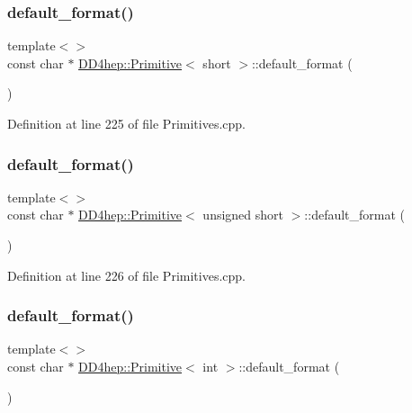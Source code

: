 \subsubsection{\texorpdfstring{default\+\_\+format()}{default\_format()}\hspace{0.1cm}{\footnotesize\ttfamily [5/15]}}
{\footnotesize\ttfamily template$<$$>$ \\
const char $\ast$ \hyperlink{struct_d_d4hep_1_1_primitive}{D\+D4hep\+::\+Primitive}$<$ short $>$\+::default\+\_\+format (\begin{DoxyParamCaption}{ }\end{DoxyParamCaption})}



Definition at line 225 of file Primitives.\+cpp.

\hypertarget{struct_d_d4hep_1_1_primitive_a37a3989db4b5acf5088bc980fef3cb16}{}\label{struct_d_d4hep_1_1_primitive_a37a3989db4b5acf5088bc980fef3cb16} 
\subsubsection{\texorpdfstring{default\+\_\+format()}{default\_format()}\hspace{0.1cm}{\footnotesize\ttfamily [6/15]}}
{\footnotesize\ttfamily template$<$$>$ \\
const char $\ast$ \hyperlink{struct_d_d4hep_1_1_primitive}{D\+D4hep\+::\+Primitive}$<$ unsigned short $>$\+::default\+\_\+format (\begin{DoxyParamCaption}{ }\end{DoxyParamCaption})}



Definition at line 226 of file Primitives.\+cpp.

\hypertarget{struct_d_d4hep_1_1_primitive_a5a493c78bc830f69543606bed337cc3d}{}\label{struct_d_d4hep_1_1_primitive_a5a493c78bc830f69543606bed337cc3d} 
\subsubsection{\texorpdfstring{default\+\_\+format()}{default\_format()}\hspace{0.1cm}{\footnotesize\ttfamily [7/15]}}
{\footnotesize\ttfamily template$<$$>$ \\
const char $\ast$ \hyperlink{struct_d_d4hep_1_1_primitive}{D\+D4hep\+::\+Primitive}$<$ int $>$\+::default\+\_\+format (\begin{DoxyParamCaption}{ }\end{DoxyParamCaption})}



